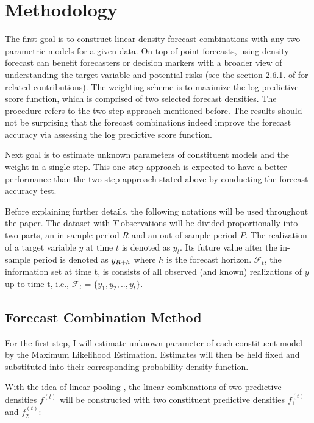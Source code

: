 \documentclass{monashthesis}
\begin{document}
\hypertarget{methodology}{%
\chapter{Methodology}\label{methodology}}

The first goal is to construct linear density forecast combinations with any two parametric models for a given data. On top of point forecasts, using density forecast can benefit forecasters or decision markers with a broader view of understanding the target variable and potential risks (see the section 2.6.1. of \textcite{FTP22} for related contributions). The weighting scheme is to maximize the log predictive score function, which is comprised of two selected forecast densities. The procedure refers to the two-step approach mentioned before. The results should not be surprising that the forecast combinations indeed improve the forecast accuracy via assessing the log predictive score function.

Next goal is to estimate unknown parameters of constituent models and the weight in a single step. This one-step approach is expected to have a better performance than the two-step approach stated above by conducting the forecast accuracy test.

Before explaining further details, the following notations will be used throughout the paper. The dataset with \(T\) observations will be divided proportionally into two parts, an in-sample period \(R\) and an out-of-sample period \(P\). The realization of a target variable \(y\) at time \(t\) is denoted as \(y_{t}\). Its future value after the in-sample period is denoted as \(y_{\small{R+h}}\) where \(h\) is the forecast horizon. \(\mathcal{F}_t\), the information set at time t, is consists of all observed (and known) realizations of \(y\) up to time t, i.e., \(\mathcal{F}_t = \{y_1, y_2, .., y_t\}\).

\hypertarget{forecast-combination-method}{%
\section{Forecast Combination Method}\label{forecast-combination-method}}

For the first step, I will estimate unknown parameter of each constituent model by the Maximum Likelihood Estimation. Estimates will then be held fixed and substituted into their corresponding probability density function.

With the idea of linear pooling \autocite{BG69,HM07,GA11}, the linear combinations of two predictive densities \(f^{(t)}\) will be constructed with two constituent predictive densities \(f^{(t)}_1\) and \(f^{(t)}_2\):
\end{document}
